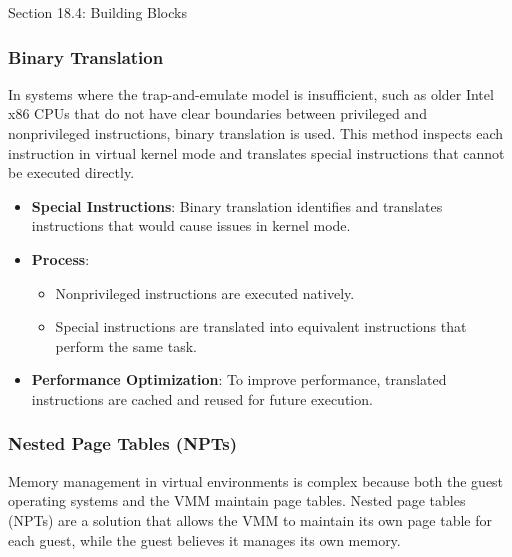 \begin{notes}{Section 18.4: Building Blocks}
\begin{highlight}
    \end{highlight}
    
    \subsubsection*{Binary Translation}
    
    In systems where the trap-and-emulate model is insufficient, such as older Intel x86 CPUs that do not have clear boundaries between privileged and nonprivileged instructions, binary translation 
    is used. This method inspects each instruction in virtual kernel mode and translates special instructions that cannot be executed directly.
    
    \begin{highlight}
    
        \begin{itemize}
            \item \textbf{Special Instructions}: Binary translation identifies and translates instructions that would cause issues in kernel mode.
            \item \textbf{Process}: 
                \begin{itemize}
                    \item Nonprivileged instructions are executed natively.
                    \item Special instructions are translated into equivalent instructions that perform the same task.
                \end{itemize}
            \item \textbf{Performance Optimization}: To improve performance, translated instructions are cached and reused for future execution.
        \end{itemize}
    
    \end{highlight}
    
    \subsubsection*{Nested Page Tables (NPTs)}
    
    Memory management in virtual environments is complex because both the guest operating systems and the VMM maintain page tables. Nested page tables (NPTs) are a solution that allows the VMM to 
    maintain its own page table for each guest, while the guest believes it manages its own memory.
    

\end{notes}
